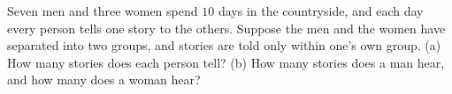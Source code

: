 Seven men and three women spend $10$ days in the countryside, and each day every person tells one story to the others. Suppose the men and the women have separated into two groups, and stories are told only within one's own group. (a) How many stories does each person tell? (b) How many stories does a man hear, and how many does a woman hear?
